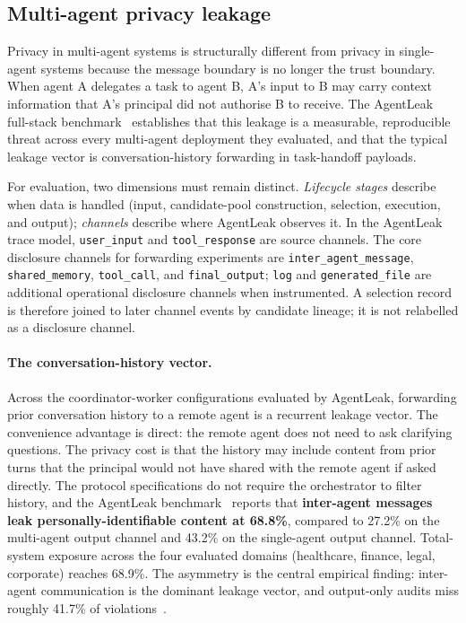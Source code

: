 \subsection{Multi-agent privacy leakage}
\label{sec:security:privacy}

Privacy in multi-agent systems is structurally different
from privacy in single-agent systems because the message
boundary is no longer the trust boundary. When agent A
delegates a task to agent B, A's input to B may carry
context information that A's principal did not authorise
B to receive. The AgentLeak full-stack
benchmark~\cite{agentleak} establishes that this leakage
is a measurable, reproducible threat across every
multi-agent deployment they evaluated, and that the
typical leakage vector is conversation-history forwarding
in task-handoff payloads.

For evaluation, two dimensions must remain distinct.
\emph{Lifecycle stages} describe when data is handled
(input, candidate-pool construction, selection, execution,
and output); \emph{channels} describe where AgentLeak
observes it. In the AgentLeak trace model,
\texttt{user\_input} and \texttt{tool\_response} are source
channels. The core disclosure channels for forwarding
experiments are \texttt{inter\_agent\_message},
\texttt{shared\_memory}, \texttt{tool\_call}, and
\texttt{final\_output}; \texttt{log} and
\texttt{generated\_file} are additional operational
disclosure channels when instrumented. A selection record
is therefore joined to later channel events by candidate
lineage; it is not relabelled as a disclosure channel.

\paragraph{The conversation-history vector.}
Across the coordinator-worker configurations evaluated by
AgentLeak, forwarding prior conversation history to a
remote agent is a recurrent leakage vector. The convenience
advantage is direct: the remote agent does not need to ask
clarifying questions. The privacy cost is that the
history may include content from prior turns that the
principal would not have shared with the remote agent if
asked directly. The protocol specifications do not
require the orchestrator to filter history, and the
AgentLeak benchmark~\cite{agentleak} reports that
\textbf{inter-agent messages leak personally-identifiable
content at 68.8\%}, compared to 27.2\% on the
multi-agent output channel and 43.2\% on the single-agent
output channel. Total-system exposure across the four
evaluated domains (healthcare, finance, legal, corporate)
reaches 68.9\%. The asymmetry is the central empirical
finding: inter-agent communication is the dominant
leakage vector, and output-only audits miss roughly
41.7\% of violations~\cite{agentleak}.

